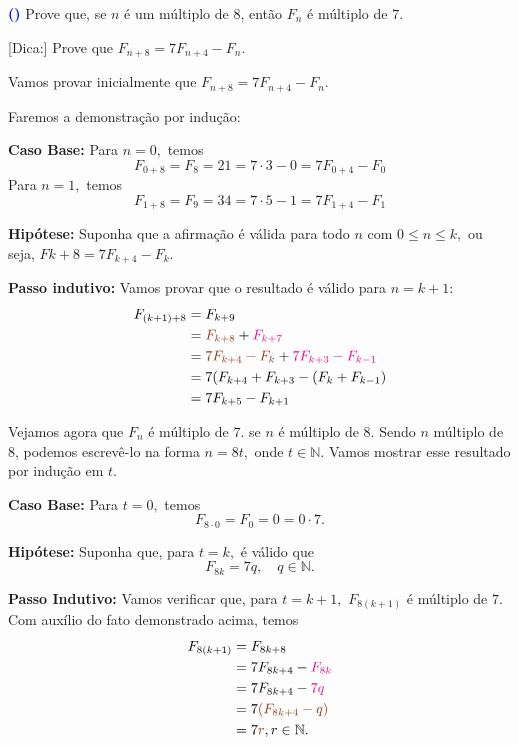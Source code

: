 \documentclass[12pt, a4paper]{article}
\newcounter{exercicio}[section]
\newenvironment{exercicio}[1][]{\refstepcounter{exercicio}\par\medskip
 \textcolor{blue}{\bf(\theexercicio)} \rmfamily}{\medskip }
\begin{document}
\begin{exercicio}
Prove que, se $n$ é um múltiplo de $8$, então $F_{n}$ é múltiplo de $7.$

\textsf{[Dica:]} Prove que $F_{n+8} = 7F_{n+4} - F_n.$
\end{exercicio}
\begin{solution}
Vamos provar inicialmente que $F_{n + 8} = 7F_{n+4} - F_n.$

Faremos a demonstração por indução:

\textbf{Caso Base:} Para $n = 0,$ temos
\[
F_{0 + 8} = F_8 = 21 = 7 \cdot 3 - 0 = 7 F_{0 + 4} - F_0
\]
Para $n = 1,$ temos
\[
F_{1 + 8} = F_9 = 34 = 7 \cdot 5 - 1 = 7 F_{1 + 4} - F_1
\]

\textbf{Hipótese:} Suponha que a afirmação é válida para todo $n$ com $0 \le n \le k,$ ou seja,
$F{k + 8} = 7F_{k+4} - F_k.$

\textbf{Passo indutivo:} Vamos provar que o resultado é válido para $n = k+1:$
\begin{align*}
F_{(k+1)+8} &= F_{k+9} \\&= \textcolor{RawSienna}{F_{k+8}} + \textcolor{Magenta}{F_{k+7}} \\&= \textcolor{RawSienna}{7F_{k+4} - F_k} + \textcolor{Magenta}{7F_{k + 3} - F_{k-1}} \\&= 7(F_{k+4} + F_{k+3} - (F_{k} + F_{k-1}) \\&= 7F_{k+5} - F_{k+1} 
\end{align*}

Vejamos agora que $F_n$ é múltiplo de $7.$ se $n$ é múltiplo de $8.$ Sendo $n$ múltiplo de $8$, podemos escrevê-lo na forma $n = 8t,$ onde $t \in \mathbb{N}.$ Vamos mostrar esse resultado por indução em $t.$

\textbf{Caso Base:} Para $t = 0,$ temos
\[
F_{8 \cdot 0} = F_0 = 0 = 0 \cdot 7.
\]

\textbf{Hipótese:} Suponha que, para $t = k,$ é válido que
\[
F_{8k} = 7 q, \quad q \in \mathbb{N}.
\]

\textbf{Passo Indutivo:} Vamos verificar que, para $t = k +1,$ $F_{8(k+1)}$ é múltiplo de $7.$ Com auxílio do fato demonstrado acima, temos
\begin{align*}
  F_{8(k+1)} &= F_{8k + 8} \\&= 7F_{8k+4} - \textcolor{Magenta}{F_{8k}} \\&= 7F_{8k+4} - \textcolor{Magenta}{7q} \\&= 7\textcolor{RawSienna}{(F_{8k+4} - q)} \\&= 7 \textcolor{RawSienna}{r}, r \in \mathbb{N}.
\end{align*}
\end{solution}
\end{document}
